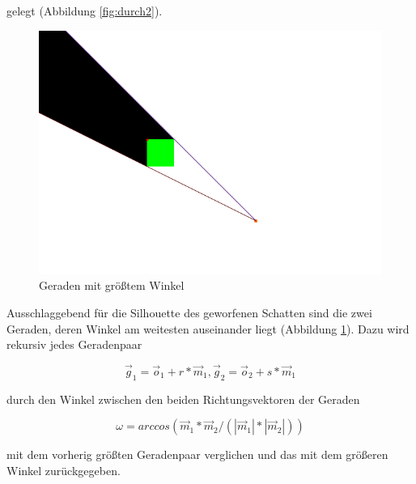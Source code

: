 gelegt (Abbildung \ref{fig:durch2}).

\begin{figure}[t]
	\centering
	\includegraphics[width=\columnwidth]{images/durchfuehrung_4.png}
	\caption{Geraden mit größtem Winkel}
	\label{fig:durch3}
\end{figure}


Ausschlaggebend für die Silhouette des geworfenen Schatten sind die zwei Geraden, deren Winkel am weitesten auseinander liegt (Abbildung \ref{fig:durch3}). Dazu wird rekursiv jedes Geradenpaar

\begin{equation}
	\vec{g}_1 = \vec{o}_1 + r * \vec{m}_1, \vec{g}_2 = \vec{o}_2 + s * \vec{m}_1
\end{equation}

durch den Winkel zwischen den beiden Richtungsvektoren der Geraden

\begin{equation}
	\omega = arccos(\vec{m}_1 * \vec{m}_2 / (|\vec{m}_1| * |\vec{m}_2|))
\end{equation}

mit dem vorherig größten Geradenpaar verglichen und das mit dem größeren Winkel zurückgegeben.

